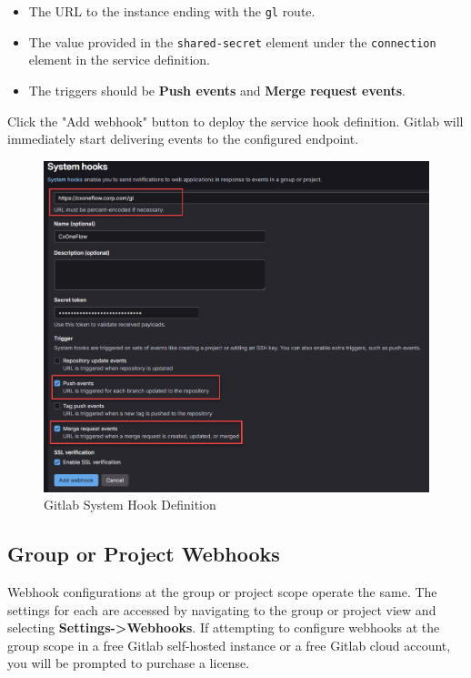 \begin{itemize}
  \item The URL to the \cxoneflow instance ending with the \texttt{gl} route.
  \item The value provided in the \texttt{shared-secret} element under the \texttt{connection} element in the service definition.
  \item The triggers should be \textbf{Push events} and \textbf{Merge request events}.
\end{itemize}

Click the "Add webhook" button to deploy the service hook definition.  Gitlab will immediately start delivering
events to the configured \cxoneflow endpoint.

\begin{figure}[ht]
  \centering
  \includegraphics[width=\textwidth]{graphics/gl-service-hooks.png}
  \caption{Gitlab System Hook Definition}
  \label{fig:gl-service-hook-def}
\end{figure}

\subsection{Group or Project Webhooks}

Webhook configurations at the group or project scope operate the same.  The settings for each
are accessed by navigating to the group or project view and selecting \textbf{Settings->Webhooks}.
If attempting to configure webhooks at the group scope in a free Gitlab self-hosted instance or
a free Gitlab cloud account, you will be prompted to purchase a license.

